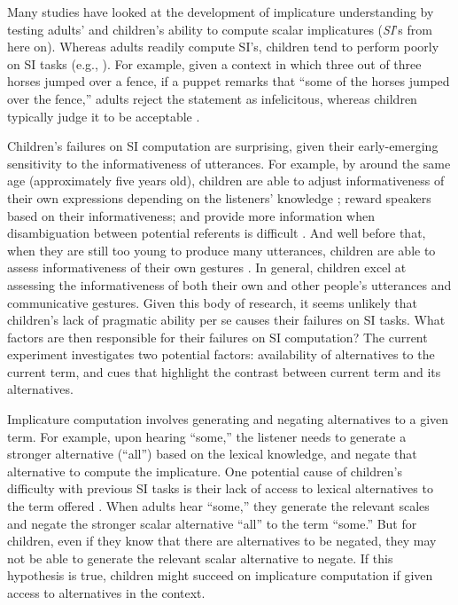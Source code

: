 \documentclass[10pt,letterpaper]{article}
\begin{document}
Many studies have looked at the development of implicature understanding by testing adults' and children's ability to compute scalar implicatures (\emph{SI}'s from here on). Whereas adults readily compute SI's, children tend to perform poorly on SI tasks (e.g., ). For example, given a context in which three out of three horses jumped over a fence, if a puppet remarks that ``some of the horses jumped over the fence,'' adults reject the statement as infelicitous, whereas children typically judge it to be acceptable \cite{papafragou2003scalar}. %

Children's failures on SI computation are surprising, given their early-emerging sensitivity to the informativeness of utterances. For example, by around the same age (approximately five years old), children are able to adjust informativeness of their own expressions depending on the listeners' knowledge \cite{matthews2006effect}; reward speakers based on their informativeness\cite{katsos2011pragmatic}; and provide more information when disambiguation between potential referents is difficult \cite{matthews2012two}. And well before that, when they are still too young to produce many utterances, children are able to assess informativeness of their own gestures \cite{o2001two}. In general, children excel at assessing the informativeness of both their own and other people's utterances and communicative gestures. Given this body of research, it seems unlikely that children's lack of pragmatic ability per se causes their failures on SI tasks. What factors are then responsible for their failures on SI computation? The current experiment investigates two potential factors: availability of alternatives to the current term, and cues that highlight the contrast between current term and its alternatives. 

Implicature computation involves generating and negating alternatives to a given term. For example, upon hearing ``some,'' the listener needs to generate a stronger alternative (``all'') based on the lexical knowledge, and negate that alternative to compute the implicature. One potential cause of children's difficulty with previous SI tasks is their lack of access to lexical alternatives to the term offered \cite{barner2011accessing}. When adults hear ``some,'' they generate the relevant scales and negate the stronger scalar alternative ``all'' to the term ``some.'' But for children, even if they know that there are alternatives to be negated, they may not be able to generate the relevant scalar alternative to negate. If this hypothesis is true, children might succeed on implicature computation if given access to alternatives in the context.
\end{document}
